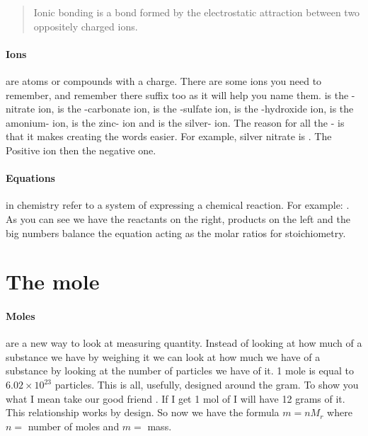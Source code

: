 	 \begin{quote}
	 Ionic bonding is a bond formed by the electrostatic attraction between two oppositely charged ions.
	 \end{quote}
	 
	 \paragraph{Ions} are atoms or compounds with a charge.
	 There are some ions you need to remember, and remember there suffix too as it will help you name them.
	  is the -nitrate ion,  is the -carbonate ion,  is the -sulfate ion,  is the -hydroxide ion,  is the amonium- ion,  is the zinc- ion and  is the silver- ion.
	 The reason for all the - is that it makes creating the words easier.
	 For example, silver nitrate is .
	 The Positive ion then the negative one.
	
	 
	 \paragraph{Equations} in chemistry refer to a system of expressing a chemical reaction. For example: .
	 As you can see we have the reactants on the right, products on the left and the big numbers balance the equation acting as the molar ratios for stoichiometry.
	 
\section{The mole}
	\paragraph{Moles} are a new way to look at measuring quantity.
	Instead of looking at how much of a substance we have by weighing it we can look at how much we have of a substance by looking at the number of particles we have of it.
	1 mole is equal to $6.02\times 10^{23}$ particles. This is all, usefully, designed around the gram. To show you what I mean take our good friend .
	If I get 1 mol of  I will have 12 grams of it.
	This relationship works by design.
	So now we have the formula $m = nM_r$ where $n =$ number of moles and $m =$ mass.
	 
